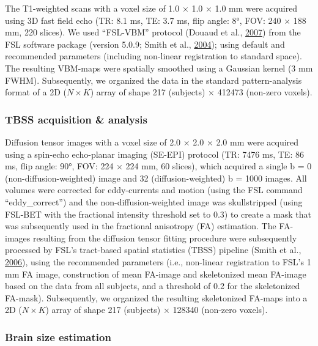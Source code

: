 \documentclass[11pt,american,a4paper,oneside,]{memoir} %
\begin{document}
The T1-weighted scans with a voxel size of 1.0 × 1.0 × 1.0 mm were acquired using 3D fast field echo (TR: 8.1 ms, TE: 3.7 ms, flip angle: 8°, FOV: 240 × 188 mm, 220 slices). We used ``FSL-VBM'' protocol (Douaud et al., \protect\hyperlink{ref-Douaud2007-sw}{2007}) from the FSL software package (version 5.0.9; Smith et al., \protect\hyperlink{ref-Smith2004-sc}{2004}); using default and recommended parameters (including non-linear registration to standard space). The resulting VBM-maps were spatially smoothed using a Gaussian kernel (3 mm FWHM). Subsequently, we organized the data in the standard pattern-analysis format of a 2D (\(N \times K\)) array of shape 217 (subjects) × 412473 (non-zero voxels).

\hypertarget{confounds-decoding-methods-data-tbss}{%
\subsubsection{TBSS acquisition \& analysis}\label{confounds-decoding-methods-data-tbss}}

Diffusion tensor images with a voxel size of 2.0 × 2.0 × 2.0 mm were acquired using a spin-echo echo-planar imaging (SE-EPI) protocol (TR: 7476 ms, TE: 86 ms, flip angle: 90°, FOV: 224 × 224 mm, 60 slices), which acquired a single b = 0 (non-diffusion-weighted) image and 32 (diffusion-weighted) b = 1000 images. All volumes were corrected for eddy-currents and motion (using the FSL command ``eddy\_correct'') and the non-diffusion-weighted image was skullstripped (using FSL-BET with the fractional intensity threshold set to 0.3) to create a mask that was subsequently used in the fractional anisotropy (FA) estimation. The FA-images resulting from the diffusion tensor fitting procedure were subsequently processed by FSL's tract-based spatial statistics (TBSS) pipeline (Smith et al., \protect\hyperlink{ref-Smith2006-sf}{2006}), using the recommended parameters (i.e., non-linear registration to FSL's 1 mm FA image, construction of mean FA-image and skeletonized mean FA-image based on the data from all subjects, and a threshold of 0.2 for the skeletonized FA-mask). Subsequently, we organized the resulting skeletonized FA-maps into a 2D (\(N \times K\)) array of shape 217 (subjects) × 128340 (non-zero voxels).

\hypertarget{confounds-decoding-methods-data-brainsize}{%
\subsubsection{Brain size estimation}\label{confounds-decoding-methods-data-brainsize}}
\end{document}
